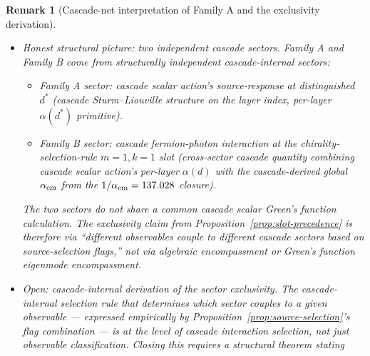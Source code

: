 \documentclass[12pt,a4paper]{article}
\newtheorem*{remark}{Remark}
\begin{document}
\begin{remark}[Cascade-net interpretation of Family A and the exclusivity derivation]
\begin{itemize}[nosep]
observables coupling to localized modes (Family A) and non-source-
selectable observables coupling to extended/distributed modes (Family B).
Direct numerical computation of the cascade scalar action's
$214$-dimensional discrete Laplacian eigenspectrum: only the lowest
mode (eigenvalue $\sim -71$, mode \#0) localizes strongly --- and only
at $d_2 = 217$ (Planck sink, peak amplitude $0.83$, effective support
$1.4$ layers). Modes peaked at the other four distinguished layers
($d_V=5$, $d_0=7$, $d_{\rm gw}=14$, $d_1=19$) are at high mode numbers
($32, 42, 62, 74$) with low peak amplitudes ($\sim 0.05$) and effective
support of $\sim 80$ layers --- they are diffuse, not localized. The
cascade scalar action's eigenmode spectrum does \emph{not} support a
``distinguished mode per distinguished layer'' structure that would
mechanically produce Family A from localized eigenmode coupling.
Verifier:
\texttt{tools/research/cascade\_eigenmode\_localization\_test.py}.
\item \emph{Honest structural picture: two independent cascade
sectors.} Family A and Family B come from \emph{structurally
independent} cascade-internal sectors:
\begin{itemize}[nosep]
\item \emph{Family A sector}: cascade scalar action's source-response
at distinguished $d^*$ (cascade Sturm--Liouville structure on the
layer index, per-layer $\alpha(d^*)$ primitive).
\item \emph{Family B sector}: cascade fermion-photon interaction at
the chirality-selection-rule $m=1, k=1$ slot (cross-sector cascade
quantity combining cascade scalar action's per-layer $\alpha(d)$ with
the cascade-derived global $\alpha_{\rm em}$ from the
$1/\alpha_{\rm em} = 137.028$ closure).
\end{itemize}
The two sectors do not share a common cascade scalar Green's function
calculation. The exclusivity claim from
Proposition~\ref{prop:slot-precedence} is therefore via ``different
observables couple to different cascade sectors based on
source-selection flags,'' not via algebraic encompassment or
Green's function eigenmode encompassment.
\item \emph{Open: cascade-internal derivation of the sector exclusivity.}
The cascade-internal selection rule that determines which sector
couples to a given observable --- expressed empirically by
Proposition~\ref{prop:source-selection}'s flag combination --- is at
the level of \emph{cascade interaction selection}, not just observable
classification. Closing this requires a structural theorem stating

\end{itemize}
\end{remark}
\end{document}
